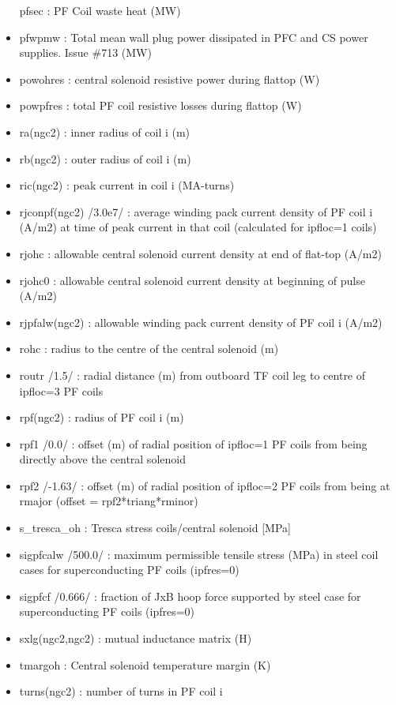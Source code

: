 \documentclass[]{article}
\begin{document}
\begin{itemize}
  pfsec : PF Coil waste heat (MW)
\item
  pfwpmw : Total mean wall plug power dissipated in PFC and CS power
  supplies. Issue \#713 (MW)
\item
  powohres : central solenoid resistive power during flattop (W)
\item
  powpfres : total PF coil resistive losses during flattop (W)
\item
  ra(ngc2) : inner radius of coil i (m)
\item
  rb(ngc2) : outer radius of coil i (m)
\item
  ric(ngc2) : peak current in coil i (MA-turns)
\item
  rjconpf(ngc2) /3.0e7/ : average winding pack current density of PF
  coil i (A/m2) at time of peak current in that coil (calculated for
  ipfloc=1 coils)
\item
  rjohc : allowable central solenoid current density at end of flat-top
  (A/m2)
\item
  rjohc0 : allowable central solenoid current density at beginning of
  pulse (A/m2)
\item
  rjpfalw(ngc2) : allowable winding pack current density of PF coil i
  (A/m2)
\item
  rohc : radius to the centre of the central solenoid (m)
\item
  routr /1.5/ : radial distance (m) from outboard TF coil leg to centre
  of ipfloc=3 PF coils
\item
  rpf(ngc2) : radius of PF coil i (m)
\item
  rpf1 /0.0/ : offset (m) of radial position of ipfloc=1 PF coils from
  being directly above the central solenoid
\item
  rpf2 /-1.63/ : offset (m) of radial position of ipfloc=2 PF coils from
  being at rmajor (offset = rpf2*triang*rminor)
\item
  s\_tresca\_oh : Tresca stress coils/central solenoid {[}MPa{]}
\item
  sigpfcalw /500.0/ : maximum permissible tensile stress (MPa) in steel
  coil cases for superconducting PF coils (ipfres=0)
\item
  sigpfcf /0.666/ : fraction of JxB hoop force supported by steel case
  for superconducting PF coils (ipfres=0)
\item
  sxlg(ngc2,ngc2) : mutual inductance matrix (H)
\item
  tmargoh : Central solenoid temperature margin (K)
\item
  turns(ngc2) : number of turns in PF coil i

\end{itemize}
\end{document}

